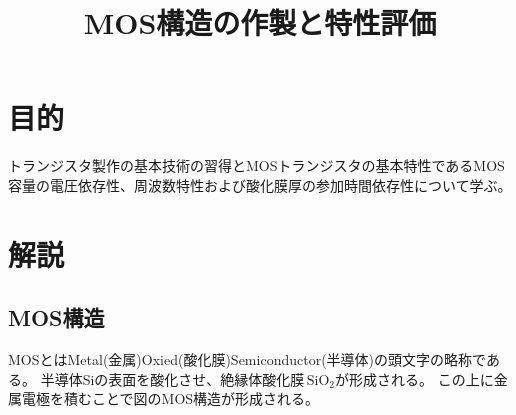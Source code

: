 \documentclass[11pt]{jarticle}
\title{MOS構造の作製と特性評価}
\begin{document}
\maketitle

\section{目的}
	トランジスタ製作の基本技術の習得とMOSトランジスタの基本特性であるMOS容量の電圧依存性、周波数特性および酸化膜厚の参加時間依存性について学ぶ。

\section{解説}
	\subsection{MOS構造}
		MOSとはMetal(金属)\-Oxied(酸化膜)\-Semiconductor(半導体)の頭文字の略称である。
		半導体Siの表面を酸化させ、絶縁体酸化膜\,$\mathrm{SiO_{2}}$が形成される。
		この上に金属電極を積むことで図のMOS構造が形成される。
\end{document}
